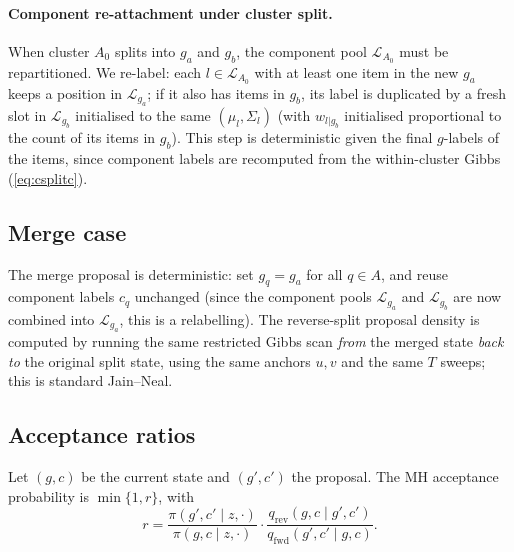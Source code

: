 \documentclass[11pt]{article}
\begin{document}
\paragraph{Component re-attachment under cluster split.}
When cluster $A_0$ splits into $g_a$ and $g_b$, the component pool
$\mathcal{L}_{A_0}$ must be repartitioned. We re-label: each $l\in
\mathcal{L}_{A_0}$ with at least one item in the new $g_a$ keeps a
position in $\mathcal{L}_{g_a}$; if it also has items in $g_b$, its label
is duplicated by a fresh slot in $\mathcal{L}_{g_b}$ initialised to the
same $(\mu_l,\Sigma_l)$ (with $w_{l|g_b}$ initialised proportional to
the count of its items in $g_b$). This step is deterministic given the
final $g$-labels of the items, since component labels are recomputed
from the within-cluster Gibbs (\ref{eq:csplitc}).

\subsection{Merge case}

The merge proposal is deterministic: set $g_q=g_a$ for all $q\in A$,
and reuse component labels $c_q$ unchanged (since the component pools
$\mathcal{L}_{g_a}$ and $\mathcal{L}_{g_b}$ are now combined into
$\mathcal{L}_{g_a}$, this is a relabelling). The reverse-split proposal
density is computed by running the same restricted Gibbs scan
\emph{from} the merged state \emph{back to} the original split state,
using the same anchors $u,v$ and the same $T$ sweeps; this is standard
Jain--Neal.

\subsection{Acceptance ratios}

Let $(g,c)$ be the current state and $(g',c')$ the proposal. The MH
acceptance probability is $\min\{1,r\}$, with
\begin{equation}
r = \frac{\pi(g',c'\mid z,\cdot)}{\pi(g,c\mid z,\cdot)}\cdot
    \frac{q_{\mathrm{rev}}(g,c\mid g',c')}{q_{\mathrm{fwd}}(g',c'\mid g,c)}.
\label{eq:r-mh}
\end{equation}
\end{document}
